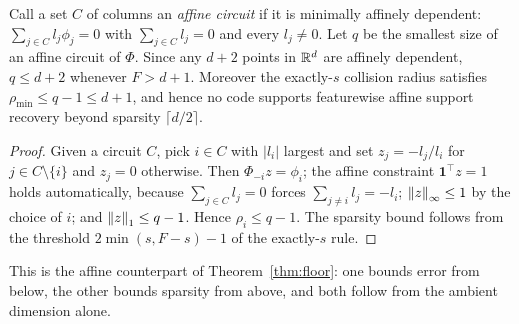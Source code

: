 \begin{proposition}
\label{prop:circuit}
Call a set $C$ of columns an \emph{affine circuit} if it is minimally affinely dependent:
$\sum_{j\in C}l_j\phi_j=0$ with $\sum_{j\in C}l_j=0$ and every $l_j\neq0$. Let $q$ be the
smallest size of an affine circuit of $\Phi$. Since any $d+2$ points in $\mathbb{R}^d$ are affinely
dependent, $q\le d+2$ whenever $F>d+1$. Moreover the exactly-$s$ collision radius satisfies
$\rho_{\min}\le q-1\le d+1$, and hence no code supports featurewise affine support recovery
beyond sparsity $\lceil d/2\rceil$.
\end{proposition}

\begin{proof}
Given a circuit $C$, pick $i\in C$ with $|l_i|$ largest and set $z_j=-l_j/l_i$ for
$j\in C\setminus\{i\}$ and $z_j=0$ otherwise. Then $\Phi_{-i}z=\phi_i$; the affine constraint
$\mathbf 1^{\top}z=1$ holds automatically, because $\sum_{j\in C}l_j=0$ forces
$\sum_{j\neq i}l_j=-l_i$; $\left\lVert z \right\rVert_\infty\le1$ by the choice of $i$; and
$\left\lVert z \right\rVert_1\le q-1$. Hence $\rho_i\le q-1$. The sparsity bound follows from the threshold
$2\min(s,F-s)-1$ of the exactly-$s$ rule.
\end{proof}

This is the affine counterpart of Theorem~\ref{thm:floor}: one bounds error from below, the other
bounds sparsity from above, and both follow from the ambient dimension alone.


